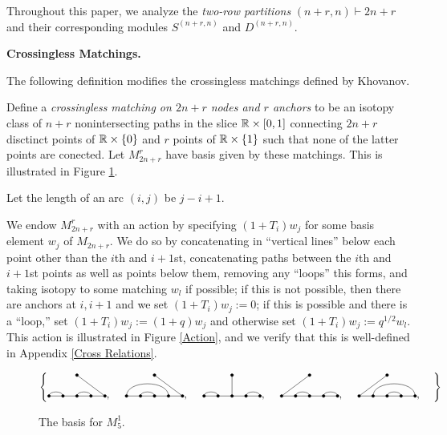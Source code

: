 \documentclass{amsart}
\newcommand{\fakesubsection}[1]{
    \vspace{7pt}
    \noindent \textbf{#1.}
  }
\begin{document}
  Throughout this paper, we analyze the \emph{two-row partitions} $(n+r,n) \vdash 2n + r$ and their corresponding modules $S^{(n+r,n)}$ and $D^{(n+r,n)}$.

  \fakesubsection{Crossingless Matchings}
  The following definition modifies the crossingless matchings defined by Khovanov.\cite{Khovanov}

  \begin{definition}
  Define a \emph{crossingless matching on $2n + r$ nodes and $r$ anchors} to be an isotopy class of $n + r$ nonintersecting paths in the slice $\mathbb{R} \times \left[ 0,1 \right]$ connecting $2n + r$ disctinct points of $\mathbb{R} \times \left\{ 0 \right\}$ and $r$ points of $\mathbb{R} \times \left\{ 1 \right\}$ such that none of the latter points are conected. 
  Let $M_{2n + r}^r$ have basis given by these matchings.
  This is illustrated in Figure \ref{S5 Basis}.
  
  Let the length of an arc $(i,j)$ be $j - i + 1$.

  We endow $M_{2n + r}^r$ with an action by specifying $(1 + T_i)w_j$ for some basis element $w_j$ of $M_{2n + r}$.
  We do so by concatenating in ``vertical lines'' below each point other than the $i$th and $i+1$st, concatenating paths between the $i$th and $i+1$st points as well as points below them, removing any ``loops'' this forms, and taking isotopy to some matching $w_l$ if possible;
  if this is not possible, then there are anchors at $i,i+1$ and we set $(1 + T_i)w_j := 0$;
  if this is possible and there is a ``loop,'' set $(1 + T_i)w_j := (1 + q)w_j$ and otherwise set $(1 + T_i)w_j := q^{1/2}w_l$.
  This action is illustrated in Figure \ref{Action}, and we verify that this is well-defined in Appendix \ref{Cross Relations}.
  \end{definition}
  \begin{figure} 
    \def\cbasisspacing{5mm}
    \begin{adjustbox}{width=\textwidth}
    $\cbr{
      \begin{gathered}
        \GeneralizedMatching{5}{1/2, 3/4}{1}{5/1}{3/4}, \hspace{\cbasisspacing}
        \GeneralizedMatching{5}{1/4, 2/3}{1}{5/1}{3/4}, \hspace{\cbasisspacing}
        \GeneralizedMatching{5}{1/2, 4/5}{1}{3/1}{3/4}, \hspace{\cbasisspacing}
        \GeneralizedMatching{5}{2/3, 4/5}{1}{1/1}{3/4}, \hspace{\cbasisspacing}
        \GeneralizedMatching{5}{2/5, 3/4}{1}{1/1}{3/4}, \hspace{\cbasisspacing}
       \end{gathered}}$ 
     \end{adjustbox}
       \caption{The basis for $M_5^1$.}
    \label{S5 Basis}
   \end{figure} 
\end{document}
